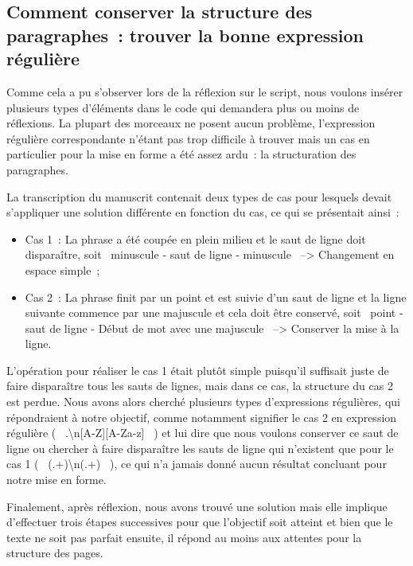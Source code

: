 \subsection{Comment conserver la structure des paragraphes~: trouver la bonne expression régulière}
Comme cela a pu s'observer lors de la réflexion sur le script, nous voulons insérer plusieurs types d'éléments dans le code qui demandera plus ou moins de réflexions. La plupart des morceaux ne posent aucun problème, l'expression régulière correspondante n'étant pas trop difficile à trouver mais un cas en particulier pour la mise en forme a été assez ardu~: la structuration des paragraphes.

La transcription du manuscrit contenait deux types de cas pour lesquels devait s'appliquer une solution différente en fonction du cas, ce qui se présentait ainsi~:
\begin{itemize}
    \item Cas 1~: La phrase a été coupée en plein milieu et le saut de ligne doit disparaître, soit  \og~minuscule - saut de ligne - minuscule~\fg{} --> Changement en espace simple~;
    \item Cas 2~: La phrase finit par un point et est suivie d'un saut de ligne et la ligne suivante commence par une majuscule et cela doit être conservé, soit  \og~point  - saut de ligne - Début de mot avec une majuscule~\fg{} --> Conserver la mise à la ligne.
\end{itemize}
L'opération pour réaliser le cas 1 était plutôt simple puisqu'il suffisait juste de faire disparaître tous les sauts de lignes, mais dans ce cas, la structure du cas 2 est perdue. Nous avons alors cherché plusieurs types d'expressions régulières, qui répondraient à notre objectif, comme notamment signifier le cas 2 en expression régulière ( \og~.\textbackslash n[A-Z][A-Za-z] ~\fg{}) et lui dire que nous voulons conserver ce saut de ligne ou chercher à faire disparaître les sauts de ligne qui n'existent que pour le cas 1 ( \og~(.+)\textbackslash n(.+) ~\fg{}), ce qui n'a jamais donné aucun résultat concluant pour notre mise en forme.

Finalement, après réflexion, nous avons trouvé une solution mais elle implique d'effectuer trois étapes successives pour que l'objectif soit atteint et bien que le texte ne soit pas parfait ensuite, il répond au moins aux attentes pour la structure des pages.

